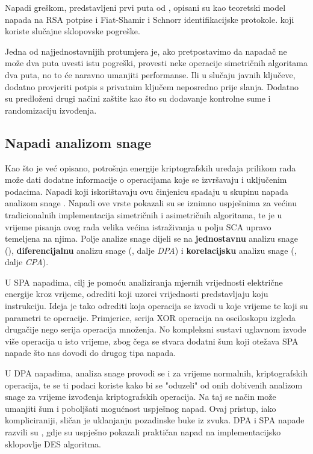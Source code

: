 \documentclass[times, utf8, diplomski]{fer}
\begin{document}
Napadi greškom, predstavljeni prvi puta od \cite{boneh1997importance}, opisani su kao teoretski model napada na RSA potpise i Fiat-Shamir i Schnorr identifikacijske protokole. koji koriste slučajne sklopovske pogreške.

Jedna od najjednostavnijih protumjera je, ako pretpostavimo da napadač ne može dva puta uvesti istu pogreški, provesti neke operacije simetričnih algoritama dva puta, no to će naravno umanjiti performanse. Ili u slučaju javnih ključeve, dodatno provjeriti potpis s privatnim ključem neposredno prije slanja. Dodatno su predloženi drugi načini zaštite kao što su dodavanje kontrolne sume i randomizaciju izvođenja.

\subsection{Napadi analizom snage}

Kao što je već opisano, potrošnja energije kriptografskih uređaja prilikom rada može dati dodatne informacije o operacijama koje se izvršavaju i uključenim podacima. Napadi koji iskorištavaju ovu činjenicu spadaju u skupinu napada analizom snage . Napadi ove vrste pokazali su se iznimno uspješnima za većinu tradicionalnih implementacija simetričnih i asimetričnih algoritama, te je u vrijeme pisanja ovog rada velika većina istraživanja u polju SCA upravo temeljena na njima. Polje analize snage dijeli se na \textbf{jednostavnu} analizu snage (), \textbf{diferencijalnu} analizu snage (, dalje \emph{DPA}) i \textbf{korelacijsku} analizu snage (, dalje \emph{CPA}).

U SPA napadima, cilj je pomoću analiziranja mjernih vrijednosti električne energije kroz vrijeme, odrediti koji uzorci vrijednosti predstavljaju koju instrukciju. Ideja je tako odrediti koja operacija se izvodi u koje vrijeme te koji su parametri te operacije. Primjerice, serija XOR operacija na osciloskopu izgleda drugačije nego serija operacija množenja. No kompleksni sustavi uglavnom izvode više operacija u isto vrijeme, zbog čega se stvara dodatni šum koji otežava SPA napade što nas dovodi do drugog tipa napada.

U DPA napadima, analiza snage provodi se i za vrijeme normalnih, kriptografskih operacija, te se ti podaci koriste kako bi se "oduzeli"
od onih dobivenih analizom snage za vrijeme izvođenja kriptografskih operacija. Na taj se način može umanjiti šum i poboljšati mogućnost uspješnog napad. Ovaj pristup, iako kompliciraniji, sličan je uklanjanju pozadinske buke iz zvuka. DPA i SPA napade razvili su \cite{kocher1999differential}, gdje su uspješno pokazali praktičan napad na implementacijsko sklopovlje DES algoritma.
\end{document}
